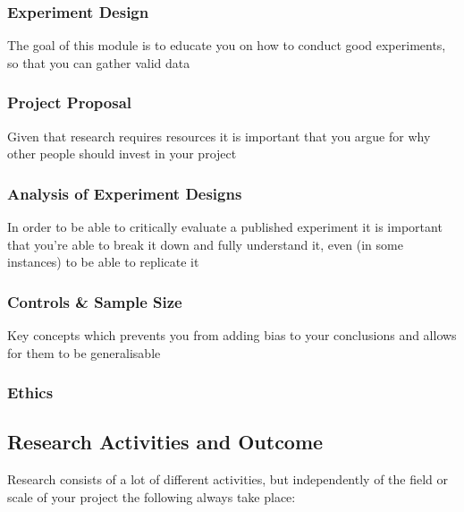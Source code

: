     \subsubsection{Experiment Design}
        \par{The goal of this module is to educate you on how to conduct good experiments, so that
you can gather valid data}

    \subsubsection{Project Proposal}
        \par{Given that research requires resources it is important that you argue for why other
people should invest in your project}

    \subsubsection{Analysis of Experiment Designs}
        \par{In order to be able to critically evaluate a published experiment it is important that
you're able to break it down and fully understand it, even (in some instances) to be able to
replicate it}

    \subsubsection{Controls \& Sample Size}
        \par{Key concepts which prevents you from  adding bias to your conclusions and allows for
them to be generalisable}

    \subsubsection{Ethics}

\subsection{Research Activities and Outcome}

    \par{Research consists of a lot of different activities, but independently of the field or scale of your project the following always take place:}


